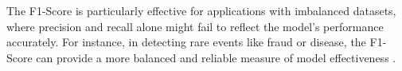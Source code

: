 The F1-Score is particularly effective for applications with imbalanced datasets, where precision and recall alone might fail to reflect the model's performance accurately. For instance, in detecting rare events like fraud or disease, the F1-Score can provide a more balanced and reliable measure of model effectiveness \cite{appliedai_evaluation_metrics}.





